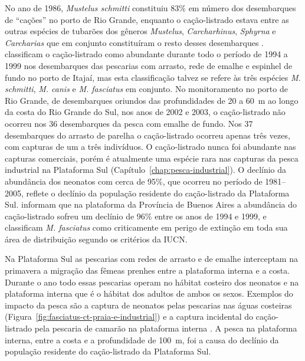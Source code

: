 \documentclass[a4paper,11pt,twoside,showtrims,onecolumn,openright,final]{memoir}
\begin{document}
No ano de 1986, \emph{Mustelus schmitti} constituiu 83\% em número dos desembarques de ``cações'' no porto 
de Rio Grande, enquanto o cação-listrado estava entre as outras espécies de tubarões dos 
gêneros \emph{Mustelus}, \emph{Carcharhinus}, \emph{Sphyrna} e \emph{Carcharias} que em conjunto 
constituíram o resto desses desembarques \citep{araujo1986}. %
\citet{mazzoleni1999} classificam o cação-listrado como abundante durante todo o
período de 1994 a 1999 nos desembarques das pescarias com arrasto, rede de emalhe 
e espinhel de fundo no porto de Itajaí, mas esta classificação talvez se refere 
às três espécies \emph{M. schmitti}, \emph{M. canis} e \emph{M. fasciatus} em conjunto. 
No monitoramento no porto de Rio Grande, de desembarques oriundos das profundidades de 20 a 60~m 
ao longo da costa do Rio Grande do Sul, nos anos de 2002 e 2003, o cação-listrado não ocorreu 
nos 36 desembarques da pesca com emalhe de fundo. Nos 37 desembarques do arrasto de parelha 
o cação-listrado ocorreu apenas três vezes, com capturas de um a três indivíduos. 
O cação-listrado nunca foi abundante nas capturas comerciais, porém é atualmente uma espécie 
rara nas capturas da pesca industrial na Plataforma Sul (Capítulo~\ref{chap:pesca-industrial}). %
O declínio da abundância dos neonatos com cerca de 95\%, que ocorreu  no período de 1981--2005, 
reflete o declínio da população residente do cação-listrado da Plataforma Sul. 
\citet{hozbor2004} informam  que na plataforma da Província de Buenos Aires a abundância 
do cação-listrado sofreu um declínio de 96\% entre os anos de 1994 e 1999, e 
classificam \emph{M. fasciatus} como criticamente em perigo de extinção em toda sua área de 
distribuição segundo os critérios da IUCN.

Na Plataforma Sul as pescarias com redes de arrasto e de emalhe  interceptam na primavera 
a migração das fêmeas prenhes entre a plataforma interna e a costa. Durante o ano todo 
essas pescarias operam no hábitat costeiro dos neonatos e na plataforma interna que é o 
hábitat dos adultos de ambos os sexos. Exemplos do impacto da pesca são a captura de 
neonatos pelas pescarias nas águas costeiras (Figura~\ref{fig:fasciatus-ct-praia-e-industrial}) 
e a captura incidental do cação-listrado pela pescaria de camarão 
na plataforma interna \citep{haimovici1996d}. %
A pesca na plataforma interna, entre a costa e a profundidade de 100~m, foi a causa do declínio  
da população residente do cação-listrado da Plataforma Sul. 
\end{document}
